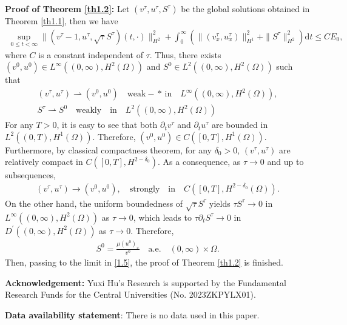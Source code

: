 \documentclass[10pt,reqno]{amsart}
\numberwithin{equation}{section}
\newcommand{\dif}{\mathrm{d}}
\begin{document}
{\bf Proof of Theorem \ref{th1.2}:}  Let  $(v^\tau, u^\tau, S^\tau)$ be the global solutions obtained in Theorem \ref{th1.1}, then we have
\begin{align}
\sup_{0\le t <\infty}\|(v^\tau-1, u^\tau, \sqrt{\tau}S^\tau)(t, \cdot)\|_{H^2}^2+ \int_0^\infty \left( \|(v^\tau_x, u^\tau_x)\|_{H^1}^2+ \|S^\tau\|_{H^2}^2 \right) \dif t \le C E_0,
\end{align}
where $C$ is a constant independent of $\tau$. Thus, there exists $(v^0, u^0)\in L^\infty((0, \infty), H^2(\Omega))$ and $S^0\in L^2((0, \infty), H^2(\Omega))$ such that
\begin{align*}
(v^\tau, u^\tau) \rightharpoonup (v^0,  u^0)\quad \mathrm{weak-}\ast \, \mathrm{in}\quad L^\infty((0, \infty), H^2(\Omega)),\\
S^\tau  \rightharpoonup S^0\quad \mathrm{weakly} \quad \mathrm{in}\quad L^2((0, \infty), H^2(\Omega))
\end{align*}
For any $T>0$, it is easy to see that both $\partial_t v^\tau$ and $\partial_t u^\tau$ are bounded in $L^2((0,T), H^1(\Omega))$. Therefore, $(v^0, u^0)\in C([0, T], H^1(\Omega))$. Furthermore, by classical compactness theorem, for any $\delta_0>0$, $(v^\tau, u^\tau)$ are relatively compact in $C([0, T], H^{2-\delta_0})$. As a consequence, as $\tau\rightarrow 0$ and up to subsequences, 
\begin{align*}
(v^\tau, u^\tau)\rightarrow (v^0, u^0), \quad \mathrm{strongly}\quad \mathrm{in}\quad C([0, T], H^{2-\delta_0}(\Omega)).
\end{align*}
On the other hand, the uniform boundedness of $\sqrt{\tau}S^\tau$ yields $\tau S^\tau \rightarrow 0$ in $L^\infty((0,\infty), H^2(\Omega))$ as $\tau \rightarrow 0$, which leads to 
$\tau \partial_t S^\tau \rightarrow 0$ in $D^\prime((0,\infty), H^2(\Omega))$ as $\tau\rightarrow 0$. Therefore, 
\begin{align}
S^0=\frac{\mu (u^0)_x}{v^0} \quad \mathrm{a.e.} \quad (0,\infty)\times \Omega.
\end{align}
Then, passing to the limit in \eqref{1.5}, the proof of Theorem \ref{th1.2} is finished.

{\bf Acknowledgement:} Yuxi Hu's Research is supported by the Fundamental Research Funds for the Central Universities (No. 2023ZKPYLX01).

{\bf Data availability statement}: There is no data used in this paper.
\end{document}
